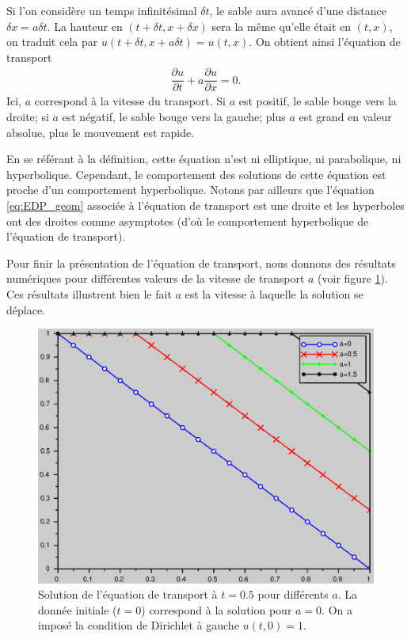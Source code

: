 \documentclass[12pt,a4paper,twoside]{article}
\begin{document}
Si l'on consid\`ere un temps infinit\'esimal $\delta t$,
le sable aura avanc\'e d'une distance $\delta x = a \delta t$.
La hauteur en $(t+\delta t , x + \delta x)$ sera la m\^eme qu'elle
\'etait en $(t,x)$, on traduit cela par $u(t+\delta t, x + a \delta t) = u(t,x)$.
On obtient ainsi l'\'equation de transport
\begin{align}
  \dfrac{\partial u}{\partial t} + a \dfrac{\partial u}{\partial x} = 0 .
\end{align}
Ici, $a$ correspond \`a la vitesse du transport.
Si $a$ est positif, le sable bouge vers la droite; si $a$ est n\'egatif,
le sable bouge vers la gauche; plus $a$ est grand en valeur absolue, 
plus le mouvement est rapide.


\begin{remark}
  En se r\'ef\'erant \`a la d\'efinition, cette \'equation n'est ni elliptique, 
  ni parabolique, ni hyperbolique. Cependant, le comportement des solutions de 
  cette \'equation est proche d'un comportement hyperbolique.
  Notons par ailleurs que l'\'equation \eqref{eq:EDP_geom} associ\'ee
  \`a l'\'equation de transport est une droite et les hyperboles ont des droites
  comme asymptotes (d'o\`u le comportement hyperbolique de l'\'equation de transport).
\end{remark}

Pour finir la pr\'esentation de l'\'equation de transport,
nous donnons des r\'esultats num\'eriques pour diff\'erentes
valeurs de la vitesse de transport $a$ (voir figure \ref{fig:transport_a}).
Ces r\'esultats illustrent bien le fait $a$ est la vitesse \`a laquelle
la solution se d\'eplace.


\begin{figure}[h]
  \centering
  \includegraphics[width = 12cm]{Figures/transport_Dir_a.eps}
  \caption{Solution de l'\'equation de transport \`a $t=0.5$
  pour diff\'erents $a$. La donn\'ee initiale ($t=0$) correspond \`a 
  la solution pour $a = 0$. On a impos\'e la condition de Dirichlet \`a gauche $u(t,0) = 1$.}
  \label{fig:transport_a}
\end{figure}
\end{document}
